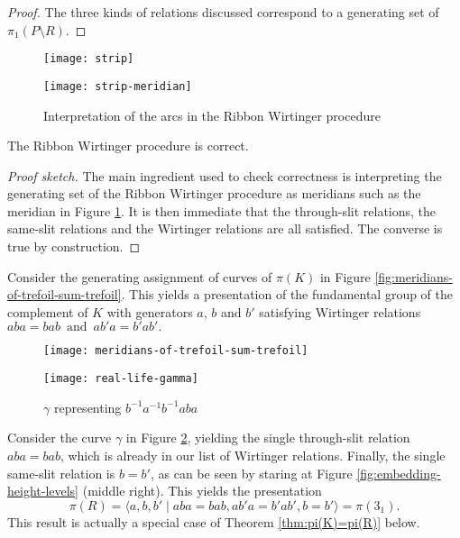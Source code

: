 \documentclass[main.tex]{subfiles}
\begin{document}
\begin{proof}
The three kinds of relations discussed correspond to a generating set of $\pi_1(P \setminus R)$.
\end{proof}

\begin{figure}[htb]
	\centering
	\begin{minipage}{0.5\textwidth}
		\centering
		\texttt{[image: strip]}
	\end{minipage}%
	\begin{minipage}{0.5\textwidth}
		\centering
		\texttt{[image: strip-meridian]}
	\end{minipage}
	\caption{Interpretation of the 
				arcs in the Ribbon 
				Wirtinger procedure}
	\label{fig:arcs-interpretation}
\end{figure}

\begin{theorem}
The Ribbon Wirtinger procedure is correct.
\end{theorem}

\begin{proof}[Proof sketch]
The main ingredient used to check correctness is interpreting the generating set of the Ribbon Wirtinger procedure as meridians such as the meridian in Figure \ref{fig:arcs-interpretation}. It is then immediate that the through-slit relations, the same-slit relations and the Wirtinger relations are all satisfied. The converse is true by construction.
\end{proof}

\begin{example}\label{ex:square-knot-ribbon}
Consider the generating assignment of curves of $\pi(K)$ in Figure \ref{fig:meridians-of-trefoil-sum-trefoil}. This yields a presentation of the fundamental group of the complement of $K$ with generators $a$, $b$ and $b'$ satisfying Wirtinger relations
$aba = bab \,\text{ and }\, ab'a = b'ab'.$

\begin{figure}[htb]
	\centering
	\begin{minipage}[b]{0.43\textwidth}
		\centering
		\texttt{[image: meridians-of-trefoil-sum-trefoil]}
		\caption{$3_1\#\bar{3}_1$}
		\label{fig:meridians-of-trefoil-sum-trefoil}
	\end{minipage}%
	\begin{minipage}[b]{0.57\textwidth}
		\centering
		\texttt{[image: real-life-gamma]}
		\caption{$\gamma$ representing $b^{-1}a^{-1}b^{-1}aba$}
		\label{fig:the-real-life-gamma}
	\end{minipage}
\end{figure}

Consider the curve $\gamma$ in Figure \ref{fig:the-real-life-gamma}, yielding the single through-slit relation $aba = bab$, which is already in our list of Wirtinger relations.
Finally, the single same-slit relation is $b = b'$, as can be seen by staring at Figure \ref{fig:embedding-height-levels} (middle right). This yields the presentation
$$
\pi(R) = \langle a, b, b' \; | \;
aba = bab, ab'a = b'ab', b = b'\rangle = \pi(3_1).$$
This result is actually a special case of Theorem \ref{thm:pi(K)=pi(R)} below.
\end{example}
\end{document}
